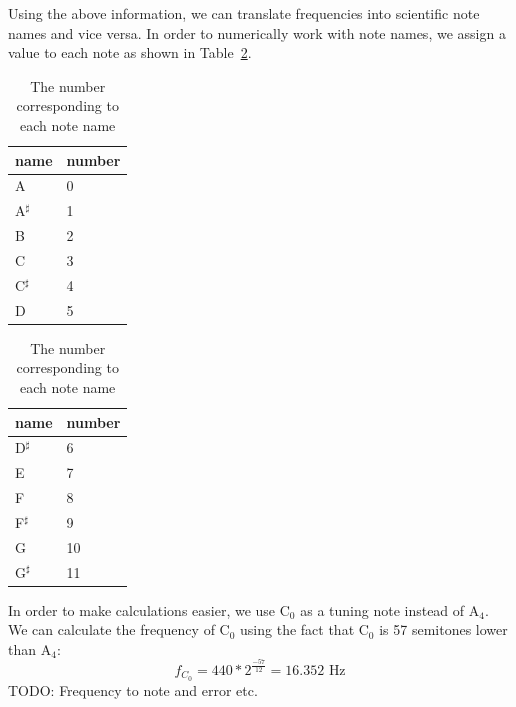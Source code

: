 \documentclass[10pt,twocolumn]{article}
\newcommand{\note}[2]{#1${}_{#2}$}
\newcommand{\notesharp}[2]{#1${}_{#2}^{\sharp}$}
\begin{document}
Using the above information, we can translate frequencies into scientific note names and vice versa. In order to numerically work with note names, we assign a value to each note as shown in Table~\ref{tab:notenames}.
\begin{table}[H]
    \hfill
    \begin{center}
        \begin{tabular}{l|l}
            name & number \\
            \hline
            \note{A}{}      & 0 \\
            \notesharp{A}{} & 1 \\
            \note{B}{}      & 2 \\
            \note{C}{}      & 3 \\
            \notesharp{C}{} & 4 \\
            \note{D}{}      & 5
        \end{tabular}
        \qquad
        \begin{tabular}{l|l}
            name & number \\
            \hline
            \notesharp{D}{} & 6 \\
            \note{E}{}      & 7 \\
            \note{F}{}      & 8 \\
            \notesharp{F}{} & 9 \\
            \note{G}{}      & 10 \\
            \notesharp{G}{} & 11
        \end{tabular}
    \end{center}
    \hfill
    \caption{The number corresponding to each note name}
    \label{tab:notenames}
\end{table}
In order to make calculations easier, we use \note{C}{0} as a tuning note instead of \note{A}{4}. We can calculate the frequency of \note{C}{0} using the fact that \note{C}{0} is 57 semitones lower than \note{A}{4}:
\[ f_{C_0} = 440 * 2^{\frac{-57}{12}} = 16.352 \text{ Hz} \]
TODO: Frequency to note and error etc.
\end{document}
